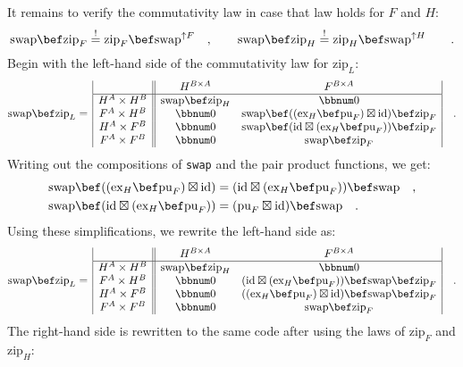 It remains to verify the commutativity law in case that law holds
for $F$ and $H$:
\[
\text{swap}\bef\text{zip}_{F}\overset{!}{=}\text{zip}_{F}\bef\text{swap}^{\uparrow F}\quad,\quad\quad\text{swap}\bef\text{zip}_{H}\overset{!}{=}\text{zip}_{H}\bef\text{swap}^{\uparrow H}\quad\quad.
\]
Begin with the left-hand side of the commutativity law for $\text{zip}_{L}$:
\[
\text{swap}\bef\text{zip}_{L}=\,\begin{array}{|c||cc|}
 & H^{B\times A} & F^{B\times A}\\
\hline H^{A}\times H^{B} & \text{swap}\bef\text{zip}_{H} & \bbnum 0\\
F^{A}\times H^{B} & \bbnum 0 & \text{swap}\bef((\text{ex}_{H}\bef\text{pu}_{F})\boxtimes\text{id})\bef\text{zip}_{F}\\
H^{A}\times F^{B} & \bbnum 0 & \text{swap}\bef(\text{id}\boxtimes(\text{ex}_{H}\bef\text{pu}_{F}))\bef\text{zip}_{F}\\
F^{A}\times F^{B} & \bbnum 0 & \text{swap}\bef\text{zip}_{F}
\end{array}\quad.
\]
Writing out the compositions of \lstinline!swap! and the pair product
functions, we get:
\begin{align*}
 & \text{swap}\bef((\text{ex}_{H}\bef\text{pu}_{F})\boxtimes\text{id})=(\text{id}\boxtimes(\text{ex}_{H}\bef\text{pu}_{F}))\bef\text{swap}\quad,\\
 & \text{swap}\bef(\text{id}\boxtimes(\text{ex}_{H}\bef\text{pu}_{F}))=(\text{pu}_{F}\boxtimes\text{id})\bef\text{swap}\quad.
\end{align*}
Using these simplifications, we rewrite the left-hand side as:
\[
\text{swap}\bef\text{zip}_{L}=\,\begin{array}{|c||cc|}
 & H^{B\times A} & F^{B\times A}\\
\hline H^{A}\times H^{B} & \text{swap}\bef\text{zip}_{H} & \bbnum 0\\
F^{A}\times H^{B} & \bbnum 0 & (\text{id}\boxtimes(\text{ex}_{H}\bef\text{pu}_{F}))\bef\text{swap}\bef\text{zip}_{F}\\
H^{A}\times F^{B} & \bbnum 0 & ((\text{ex}_{H}\bef\text{pu}_{F})\boxtimes\text{id})\bef\text{swap}\bef\text{zip}_{F}\\
F^{A}\times F^{B} & \bbnum 0 & \text{swap}\bef\text{zip}_{F}
\end{array}\quad.
\]
The right-hand side is rewritten to the same code after using the
laws of $\text{zip}_{F}$ and $\text{zip}_{H}$:
